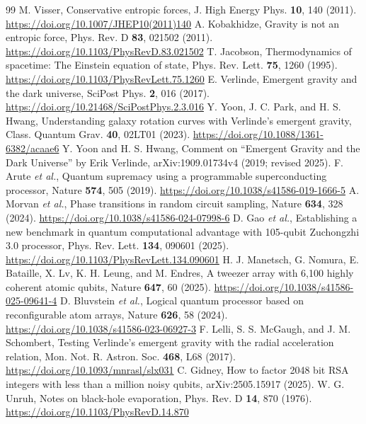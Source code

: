 \documentclass[aps,prd,twocolumn,superscriptaddress,nofootinbib,showkeys]{revtex4-2}
\begin{document}
\begin{thebibliography}{99}
 M. Visser, Conservative entropic forces, J. High Energy Phys. \textbf{10}, 140 (2011). \url{https://doi.org/10.1007/JHEP10(2011)140}
 A. Kobakhidze, Gravity is not an entropic force, Phys. Rev. D \textbf{83}, 021502 (2011). \url{https://doi.org/10.1103/PhysRevD.83.021502}
 T. Jacobson, Thermodynamics of spacetime: The Einstein equation of state, Phys. Rev. Lett. \textbf{75}, 1260 (1995). \url{https://doi.org/10.1103/PhysRevLett.75.1260}
 E. Verlinde, Emergent gravity and the dark universe, SciPost Phys. \textbf{2}, 016 (2017). \url{https://doi.org/10.21468/SciPostPhys.2.3.016}
 Y. Yoon, J. C. Park, and H. S. Hwang, Understanding galaxy rotation curves with Verlinde's emergent gravity, Class. Quantum Grav. \textbf{40}, 02LT01 (2023). \url{https://doi.org/10.1088/1361-6382/acaae6}
 Y. Yoon and H. S. Hwang, Comment on ``Emergent Gravity and the Dark Universe'' by Erik Verlinde, arXiv:1909.01734v4 (2019; revised 2025).
 F. Arute \emph{et al.}, Quantum supremacy using a programmable superconducting processor, Nature \textbf{574}, 505 (2019). \url{https://doi.org/10.1038/s41586-019-1666-5}
 A. Morvan \emph{et al.}, Phase transitions in random circuit sampling, Nature \textbf{634}, 328 (2024). \url{https://doi.org/10.1038/s41586-024-07998-6}
 D. Gao \emph{et al.}, Establishing a new benchmark in quantum computational advantage with 105-qubit Zuchongzhi 3.0 processor, Phys. Rev. Lett. \textbf{134}, 090601 (2025). \url{https://doi.org/10.1103/PhysRevLett.134.090601}
 H. J. Manetsch, G. Nomura, E. Bataille, X. Lv, K. H. Leung, and M. Endres, A tweezer array with 6,100 highly coherent atomic qubits, Nature \textbf{647}, 60 (2025). \url{https://doi.org/10.1038/s41586-025-09641-4}
 D. Bluvstein \emph{et al.}, Logical quantum processor based on reconfigurable atom arrays, Nature \textbf{626}, 58 (2024). \url{https://doi.org/10.1038/s41586-023-06927-3}
 F. Lelli, S. S. McGaugh, and J. M. Schombert, Testing Verlinde's emergent gravity with the radial acceleration relation, Mon. Not. R. Astron. Soc. \textbf{468}, L68 (2017). \url{https://doi.org/10.1093/mnrasl/slx031}
 C. Gidney, How to factor 2048 bit RSA integers with less than a million noisy qubits, arXiv:2505.15917 (2025).
 W. G. Unruh, Notes on black-hole evaporation, Phys. Rev. D \textbf{14}, 870 (1976). \url{https://doi.org/10.1103/PhysRevD.14.870}

\end{thebibliography}
\end{document}
